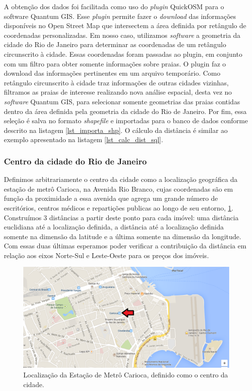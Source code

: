 A obtenção dos dados foi facilitada como uso do \textit{plugin} QuickOSM para o software Quantum GIS. Esse \textit{plugin} permite fazer o \textit{download} das informações disponíveis no Open Street Map que intersectem a área definida por retângulo de coordenadas personalizadas. Em nosso caso, utilizamos \textit{software} a geometria da cidade do Rio de Janeiro para determinar as coordenadas de um retângulo circunscrito à cidade. Essas coordenadas foram passadas ao plugin, em conjunto com um filtro para obter somente informações sobre praias. O plugin faz o  download das informações pertinentes em um arquivo temporário. Como  retângulo circunscrito à cidade traz informações de outras cidades vizinhas, filtramos as praias de interesse realizando nova análise espacial, desta vez no \textit{software} Quantum GIS, para selecionar somente geometrias das praias contidas dentro da área definida pela geometria da cidade do Rio de Janeiro. Por fim, essa seleção é salva no formato \textit{shapefile} e importadas para o banco de dados conforme descrito na listagem \ref{lst_importa_shp}. O cálculo da distância é similar ao exemplo apresentado na listagem \ref{lst_calc_dist_sql}.

\subsubsection{Centro da cidade do Rio de Janeiro}

Definimos arbitrariamente o centro da cidade como a localização geográfica da estação de metrô Carioca, na Avenida Rio Branco, cujas coordenadas são  em função da proximidade a essa avenida que agrega um grande número de escritórios, centros médicos e repartições publicas ao longo de seu entorno, \cref{fig:loc_metro_carioca}. Construímos 3 distâncias a partir deste ponto para cada imóvel: uma distância euclidiana até a localização definida, a distância até a localização definida somente na dimensão da latitude e a última somente na dimensão da longitude. Com essas duas últimas esperamos poder verificar a contribuição da distância em relação aos eixos Norte-Sul e Leste-Oeste para os preços dos imóveis.

\begin{figure}[h!]
\centering
\includegraphics[width=1\linewidth]{img/loc_metro_carioca}
\caption{Localização da Estação de Metrô Carioca, definido como o centro da cidade.}
\label{fig:loc_metro_carioca}
\end{figure}


